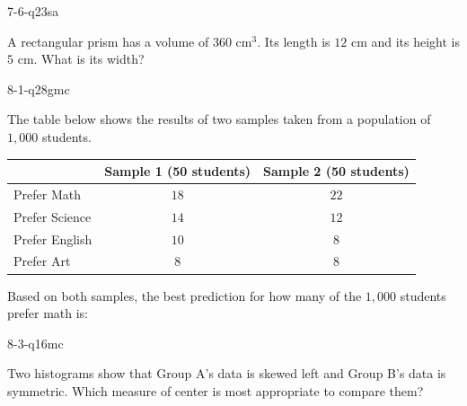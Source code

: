 \begin{practiceQuestion}{7-6-q23}{sa}
\begin{questionText}
A rectangular prism has a volume of $360$ cm$^3$. Its length is $12$ cm and its height is $5$ cm. What is its width?
\end{questionText}
\end{practiceQuestion}

\begin{practiceQuestion}{8-1-q28}{gmc}
\begin{questionText}
The table below shows the results of two samples taken from a population of $1{,}000$ students.

\begin{center}
\begin{tabular}{|l|c|c|}
\hline
 & \textbf{Sample 1 (50 students)} & \textbf{Sample 2 (50 students)} \\
\hline
Prefer Math & $18$ & $22$ \\
\hline
Prefer Science & $14$ & $12$ \\
\hline
Prefer English & $10$ & $8$ \\
\hline
Prefer Art & $8$ & $8$ \\
\hline
\end{tabular}
\end{center}

Based on both samples, the best prediction for how many of the $1{,}000$ students prefer math is:
\end{questionText}
\end{practiceQuestion}

\begin{practiceQuestion}{8-3-q16}{mc}
\begin{questionText}
Two histograms show that Group A's data is skewed left and Group B's data is symmetric. Which measure of center is most appropriate to compare them?
\end{questionText}
\end{practiceQuestion}

